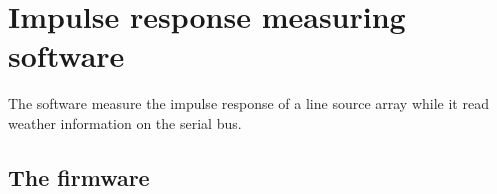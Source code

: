 \chapter{Impulse response measuring software}\label{ap:imp_res_meas_soft}
The software measure the impulse response of a line source array while it read weather information on the serial bus.


\section*{The firmware}




